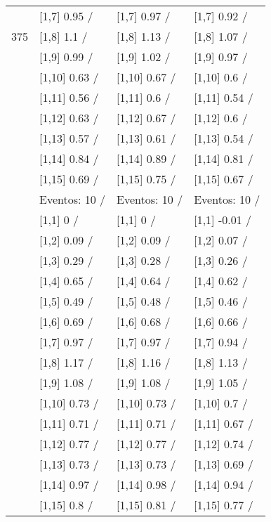 \begin{table}
\begin{tabular}[t]{llll}
 & {}[1,7] 0.95  / & {}[1,7] 0.97  / & {}[1,7] 0.92  /\\
375 & {}[1,8] 1.1  / & {}[1,8] 1.13  / & {}[1,8] 1.07  /\\
\addlinespace
 & {}[1,9] 0.99  / & {}[1,9] 1.02  / & {}[1,9] 0.97  /\\
 & {}[1,10] 0.63  / & {}[1,10] 0.67  / & {}[1,10] 0.6  /\\
 & {}[1,11] 0.56  / & {}[1,11] 0.6  / & {}[1,11] 0.54  /\\
 & {}[1,12] 0.63  / & {}[1,12] 0.67  / & {}[1,12] 0.6  /\\
 & {}[1,13] 0.57  / & {}[1,13] 0.61  / & {}[1,13] 0.54  /\\
\addlinespace
 & {}[1,14] 0.84  / & {}[1,14] 0.89  / & {}[1,14] 0.81  /\\
 & {}[1,15] 0.69  / & {}[1,15] 0.75  / & {}[1,15] 0.67  /\\
 & Eventos:  10 / & Eventos:  10 / & Eventos:  10 /\\
 & {}[1,1] 0  / & {}[1,1] 0  / & {}[1,1] -0.01  /\\
 & {}[1,2] 0.09  / & {}[1,2] 0.09  / & {}[1,2] 0.07  /\\
\addlinespace
 & {}[1,3] 0.29  / & {}[1,3] 0.28  / & {}[1,3] 0.26  /\\
 & {}[1,4] 0.65  / & {}[1,4] 0.64  / & {}[1,4] 0.62  /\\
 & {}[1,5] 0.49  / & {}[1,5] 0.48  / & {}[1,5] 0.46  /\\
 & {}[1,6] 0.69  / & {}[1,6] 0.68  / & {}[1,6] 0.66  /\\
 & {}[1,7] 0.97  / & {}[1,7] 0.97  / & {}[1,7] 0.94  /\\
\addlinespace
500 & {}[1,8] 1.17  / & {}[1,8] 1.16  / & {}[1,8] 1.13  /\\
 & {}[1,9] 1.08  / & {}[1,9] 1.08  / & {}[1,9] 1.05  /\\
 & {}[1,10] 0.73  / & {}[1,10] 0.73  / & {}[1,10] 0.7  /\\
 & {}[1,11] 0.71  / & {}[1,11] 0.71  / & {}[1,11] 0.67  /\\
 & {}[1,12] 0.77  / & {}[1,12] 0.77  / & {}[1,12] 0.74  /\\
\addlinespace
 & {}[1,13] 0.73  / & {}[1,13] 0.73  / & {}[1,13] 0.69  /\\
 & {}[1,14] 0.97  / & {}[1,14] 0.98  / & {}[1,14] 0.94  /\\
 & {}[1,15] 0.8  / & {}[1,15] 0.81  / & {}[1,15] 0.77  /\\
\bottomrule
\end{tabular}
\end{table}
